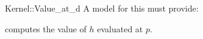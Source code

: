 \begin{ccRefFunctionObjectConcept}{Kernel::Value_at_d}
A model for this must provide:


 {computes the value of $h$ evaluated
  at $p$. }

\end{ccRefFunctionObjectConcept}
